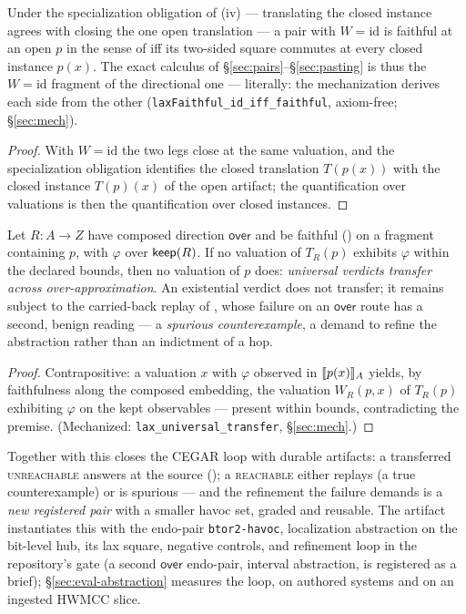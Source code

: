 \begin{proposition}
\label{prop:exactid}
Under the specialization obligation of (iv) ---
translating the closed instance agrees with closing the one open
translation --- a pair with $W = \mathrm{id}$ is faithful at an open
$p$ in the sense of  iff its two-sided square
commutes at every closed instance $p(x)$. The exact calculus of
\S\ref{sec:pairs}--\S\ref{sec:pasting} is thus the
$W = \mathrm{id}$ fragment of the directional one --- literally: the
mechanization derives each side from the other
(\texttt{laxFaithful\_id\_iff\_faithful}, axiom-free;
\S\ref{sec:mech}).
\end{proposition}

\begin{proof}
With $W = \mathrm{id}$ the two legs close at the same valuation, and
the specialization obligation identifies the closed translation
$T(p(x))$ with the closed instance $T(p)(x)$ of the open artifact;
the quantification over valuations is then the quantification over
closed instances.
\end{proof}

\begin{proposition}
\label{prop:lax}
Let $R : A \to Z$ have composed direction $\mathsf{over}$ and be
faithful () on a fragment containing $p$, with
$\varphi$ over $\mathsf{keep}(R)$. If no valuation of $T_R(p)$ exhibits
$\varphi$ within the declared bounds, then no valuation of $p$ does:
\emph{universal verdicts transfer across over-approximation}. An
existential verdict does not transfer; it remains subject to the
carried-back replay of , whose failure on an
$\mathsf{over}$ route has a second, benign reading --- a \emph{spurious
counterexample}, a demand to refine the abstraction rather than an
indictment of a hop.
\end{proposition}

\begin{proof}
Contrapositive: a valuation $x$ with $\varphi$ observed in
$\llbracket p(x) \rrbracket_{A}$ yields, by faithfulness along the composed embedding,
the valuation $W_R(p,x)$ of $T_R(p)$ exhibiting $\varphi$ on the kept
observables --- present within bounds, contradicting the premise.
(Mechanized: \texttt{lax\_universal\_transfer}, \S\ref{sec:mech}.)
\end{proof}

Together with  this closes the
CEGAR loop with durable artifacts: a transferred \textsc{unreachable}
answers at the source (); a \textsc{reachable} either
replays (a true counterexample) or is spurious --- and the refinement
the failure demands is a \emph{new registered pair} with a smaller
havoc set, graded and reusable. The artifact instantiates this with
the endo-pair \texttt{btor2-havoc}, localization abstraction on the
bit-level hub, its lax square, negative controls, and refinement loop
in the repository's gate (a second $\mathsf{over}$ endo-pair, interval
abstraction, is registered as a brief); \S\ref{sec:eval-abstraction}
measures the loop, on authored systems and on an ingested HWMCC
slice.

